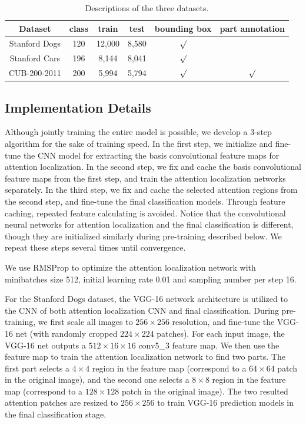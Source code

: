 \documentclass[10pt,twocolumn,letterpaper]{article}
\begin{document}
\begin{table}[htb]
\begin{center}
\begin{tabular}
{c|c|c|c|c|c}\hline
Dataset & class & train & test & bounding box & part annotation   \\\hline\hline
Stanford Dogs & 120 & 12,000  &  8,580 & $\surd$ &    \\
Stanford Cars & 196 & 8,144  & 8,041 & $\surd$ &  \\
CUB-200-2011 & 200 & 5,994 & 5,794 & $\surd$ & $\surd$ \\\hline
\end{tabular}
\caption{Descriptions of the three datasets.}
\end{center}
\end{table}

\subsection{Implementation Details}
Although jointly training the entire model is possible, we develop a 3-step algorithm for the sake of training speed.
In the first step, we initialize and fine-tune the CNN model for extracting the basis convolutional feature maps for attention localization.
In the second step, we fix and cache the basis convolutional feature maps from the first step, and train the attention localization networks separately.
In the third step, we fix and cache the selected attention regions from the second step, and fine-tune the final classification models.
Through feature caching, repeated feature calculating is avoided.
Notice that the convolutional neural networks for attention localization and the final classification is different, though they are initialized similarly during pre-training described below.
We repeat these steps several times until convergence.

We use RMSProp to optimize the attention localization network with minibatches size 512, initial learning rate 0.01 and sampling number per step 16.

For the Stanford Dogs dataset, the VGG-16 \cite{bd8} network architecture is utilized to the CNN of both attention localization CNN and final classification.
During pre-training, we first scale all images to $256 \times256 $ resolution, and fine-tune the VGG-16 net (with randomly cropped $224\times224$ patches).
For each input image, the VGG-16 net outputs a $512\times16\times16$ conv5\_3 feature map.
We then use the feature map to train the attention localization network to find two parts.
The first part selects a $4\times4$ region in the feature map (correspond to a $64\times64$ patch in the original image), and the second one selects a $8\times8$ region in the feature map (correspond to a $128\times128$ patch in the original image).
The two resulted attention patches are resized to $256\times256$ to train VGG-16 prediction models in the final classification stage.
\end{document}
